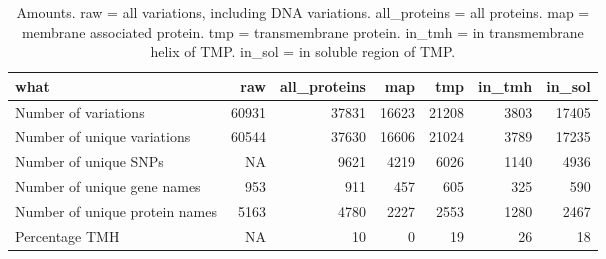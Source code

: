 \begin{table}

\caption{\label{tab:ncbi_counts_1}Amounts. raw = all variations, including DNA variations. all\_proteins = all proteins. map = membrane associated protein. tmp = transmembrane protein. in\_tmh = in transmembrane helix of TMP. in\_sol = in soluble region of TMP. }
\centering
\begin{tabular}[t]{l|r|r|r|r|r|r}
\hline
what & raw & all\_proteins & map & tmp & in\_tmh & in\_sol\\
\hline
Number of variations & 60931 & 37831 & 16623 & 21208 & 3803 & 17405\\
\hline
Number of unique variations & 60544 & 37630 & 16606 & 21024 & 3789 & 17235\\
\hline
Number of unique SNPs & NA & 9621 & 4219 & 6026 & 1140 & 4936\\
\hline
Number of unique gene names & 953 & 911 & 457 & 605 & 325 & 590\\
\hline
Number of unique protein names & 5163 & 4780 & 2227 & 2553 & 1280 & 2467\\
\hline
Percentage TMH & NA & 10 & 0 & 19 & 26 & 18\\
\hline
\end{tabular}
\end{table}